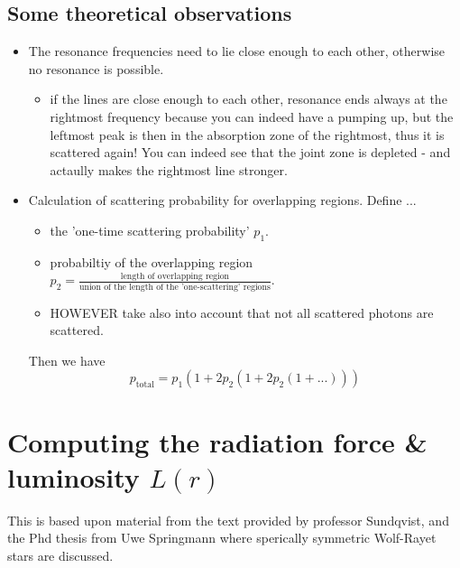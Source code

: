 \documentclass[../main/main.tex]{subfiles}
\begin{document}
\subsection{Some theoretical observations}
\begin{itemize}
\item The resonance frequencies need to lie close enough to each other, otherwise no resonance is possible.

\begin{itemize}
\item if the lines are close enough to each other, resonance ends always at the rightmost frequency because you can indeed have a pumping up, but the leftmost peak is then in the absorption zone of the rightmost, thus it is scattered again! You can indeed see that the joint zone is depleted - and actaully makes the rightmost line stronger.
\end{itemize}


\item Calculation of scattering probability for overlapping regions. Define ...
\begin{itemize}
\item the 'one-time scattering probability' $p_1$.
\item probabiltiy of the overlapping region $p_2 = \frac{\text{length of overlapping region}}{\text{union of the length of the 'one-scattering' regions}}$. 
\item HOWEVER take also into account that not all scattered photons are scattered.
\end{itemize}
Then we have
\begin{equation}
p_{\text{total}} = p_1(1+2p_2(1+2p_2(1+...)))
\end{equation}

\end{itemize}

\newpage
\section{Computing the radiation force \& luminosity $L(r)$}
\label{computing_radiation_force}

This is based upon material from the text provided by professor Sundqvist, and the Phd thesis from Uwe Springmann \cite{UweSpringmannPHD} where sperically symmetric Wolf-Rayet stars are discussed.
\end{document}
